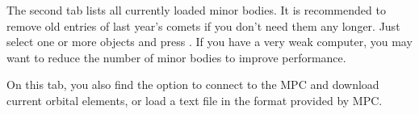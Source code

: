 The second tab lists all currently loaded minor bodies.  It is recommended
to remove old entries of last year's comets if you don't need them any
longer. Just select one or more objects and press .
If you have a very weak computer, you may want to reduce the number of
minor bodies to improve performance.

On this tab, you also find the option to connect to the MPC and download current orbital elements, 
or load a text file in the format provided by MPC. 




